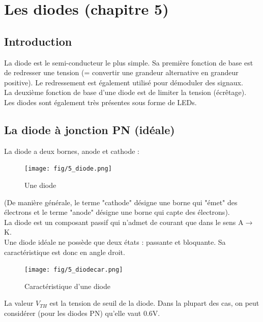 \documentclass[a4paper]{article}
\begin{document}
\section{Les diodes (chapitre 5)}
    
    \subsection{Introduction}
    La diode est le semi-conducteur le plus simple. Sa première fonction de base est de 
    redresser une tension (= convertir une grandeur alternative en grandeur positive).
    Le redressement est également utilisé pour démoduler des signaux.\\

    La deuxième fonction de base d'une diode est de limiter la tension (écrêtage).\\

    Les diodes sont également très présentes sous forme de LEDs.

    \subsection{La diode à jonction PN (idéale)}
    La diode a deux bornes, anode et cathode :
    \begin{figure}[H]
        \begin{center}
            \texttt{[image: fig/5\_diode.png]}
            \caption{Une diode}
            \label{fig:5_diode}
        \end{center}
    \end{figure}

    (De manière générale, le terme "cathode" désigne une borne qui "émet" des électrons
    et le terme "anode" désigne une borne qui capte des électrons).\\

    La diode est un composant passif qui n'admet de courant que dans le sens A$\rightarrow$K.\\

    Une diode idéale ne possède que deux états : passante et bloquante. Sa 
    caractéristique est donc en angle droit.
    \begin{figure}[H]
        \begin{center}
            \texttt{[image: fig/5\_diodecar.png]}
            \caption{Caractéristique d'une diode}
            \label{fig:5_diodecar}
        \end{center}
    \end{figure}
    La valeur $V_{TH}$ est la tension de seuil de la diode. Dans la plupart des cas,
    on peut considérer (pour les diodes PN) qu'elle vaut 0.6V.
\end{document}
